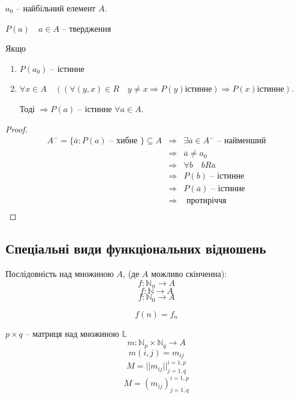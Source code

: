$a_0$ -- найбільний елемент $A$.

$P(a) \quad a \in A$ -- твердження

\begin{theorem}
    Якщо
    \begin{enumerate}
        \item $P(a_0)$ -- істинне
        \item $\forall x \in A \quad ((\forall (y,x) \in R \quad y \neq x \Rightarrow P(y) \text{істинне})
            \Rightarrow P(x) \text{істинне})$.
        
        Тоді $\Rightarrow P(a) \text{ -- істинне } \forall a \in A$.
    \end{enumerate}
\end{theorem}
\begin{proof}
    $$\begin{array}{rcl}
        A^- = \{\overline{a}: P(a) \text{ -- хибне }\} \subseteq A
        & \Rightarrow & \exists \overline{a} \in A^- \text{ -- найменший} \\
        & \Rightarrow & \overline{a} \neq a_0 \\
        & \Rightarrow & \forall b \quad bR\overline{a} \\
        & \Rightarrow & P(b) \text{ -- істинне } \\
        & \Rightarrow & P(\overline{a}) \text{ -- істинне } \\
        & \Rightarrow & \text{ протиріччя } \\
    \end{array}$$
\end{proof}


\subsection{Спеціальні види функціональних відношень}

\begin{definition}
    Послідовність над множиною $A$, (де $A$ можливо скінченна):
    $$f: \mathbb{N}_{n} \rightarrow A$$
    $$f: \mathbb{N} \rightarrow A$$
    $$f: \mathbb{N}_{0} \rightarrow A$$
\end{definition}

$$f(n) = f_n$$

\begin{definition}
    $p \times q$ -- матриця над множиною $\mathbb{L}$
    $$m: \mathbb{N}_{p} \times \mathbb{N}_{q} \rightarrow A$$
    $$m(i, j) = m_{ij}$$
    $$M = ||m_{ij}||_{j = \overline{1, q}}^{i = \overline{1, p}}$$
    $$M = (m_{ij})_{j = \overline{1, q}}^{i = \overline{1, p}}$$
\end{definition}

